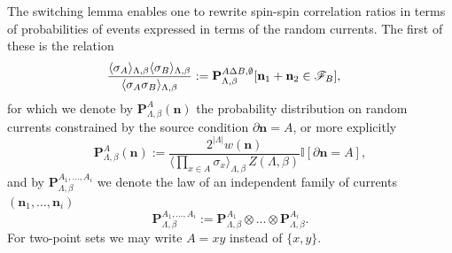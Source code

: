 \documentclass[a4paper,oneside,11pt]{article}
\numberwithin{equation}{section}
\numberwithin{equation}{section}
\numberwithin{equation}{section}
\newcommand{\calF}{\mathcal{F}}
\newcommand{\bbI}{\mathbb{I}}
\newcommand{\n}{\mathbf{n}}
\begin{document}
The switching lemma enables one to rewrite spin-spin correlation ratios in terms of probabilities of  events expressed in terms of the random currents.  The first of these is the relation  
\begin{align}\label{eq:orgaf}\frac{\langle\sigma_A\rangle_{\Lambda,\beta}\langle\sigma_B\rangle_{\Lambda,\beta}}{\langle\sigma_A\sigma_B\rangle_{\Lambda,\beta}}&:={\bf P}^{A\Delta B,\emptyset}_{\Lambda,\beta}[\n_1+\n_2\in \calF_B],\end{align}
for which we denote by 
$\mathbf P_{\Lambda,\beta}^{A} \left(\n \right)$ the probability distribution on random currents constrained by the source condition $\partial \n = A$, or more explicitly   
\begin{equation} \label{eq:Pr}
\mathbf P_{\Lambda,\beta}^{A} \left(\n \right)  :=   
\frac{2^{|\Lambda|} w(\n)} {\langle \prod_{x\in A} \sigma_x \rangle_{\Lambda,\beta} \, Z(\Lambda,\beta) }  \bbI [\partial \n = A],
\end{equation} 
and by $\mathbf P_{\Lambda,\beta}^{A_1,\dots,A_i} $ we denote the  law of an independent family of currents $(\n_1,\dots,\n_i)$
\begin{equation} \label{eq:2Pr}
\mathbf P_{\Lambda,\beta}^{A_1,\dots,A_i} :=  \mathbf P_{\Lambda,\beta}^{A_1} \otimes\dots\otimes \mathbf P_{\Lambda,\beta}^{A_i}. \end{equation}  
For two-point sets we may write $A=xy$ instead of $\{x,y\}$.  
\end{document}
